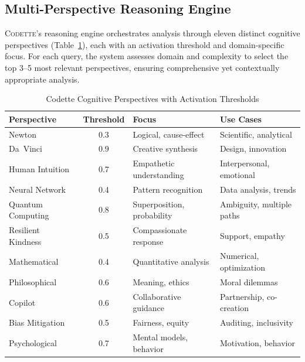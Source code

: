 \documentclass[11pt,a4paper]{article}
\newcommand{\codette}{\textsc{Codette}}
\begin{document}
\subsection{Multi-Perspective Reasoning Engine}
\codette{}'s reasoning engine orchestrates analysis through eleven distinct cognitive perspectives (Table~\ref{tab:perspectives}), each with an activation threshold and domain-specific focus. For each query, the system assesses domain and complexity to select the top 3--5 most relevant perspectives, ensuring comprehensive yet contextually appropriate analysis.

\begin{table}[H]
\centering
\caption{Codette Cognitive Perspectives with Activation Thresholds}
\label{tab:perspectives}
\begin{tabular}{@{}lcll@{}}
\toprule
\textbf{Perspective} & \textbf{Threshold} & \textbf{Focus} & \textbf{Use Cases} \\
\midrule
Newton         & 0.3 & Logical, cause-effect      & Scientific, analytical \\
Da~Vinci       & 0.9 & Creative synthesis          & Design, innovation \\
Human Intuition & 0.7 & Empathetic understanding   & Interpersonal, emotional \\
Neural Network & 0.4 & Pattern recognition         & Data analysis, trends \\
Quantum Computing & 0.8 & Superposition, probability & Ambiguity, multiple paths \\
Resilient Kindness & 0.5 & Compassionate response    & Support, empathy \\
Mathematical   & 0.4 & Quantitative analysis       & Numerical, optimization \\
Philosophical  & 0.6 & Meaning, ethics             & Moral dilemmas \\
Copilot        & 0.6 & Collaborative guidance      & Partnership, co-creation \\
Bias Mitigation & 0.5 & Fairness, equity           & Auditing, inclusivity \\
Psychological  & 0.7 & Mental models, behavior     & Motivation, behavior \\
\bottomrule
\end{tabular}
\end{table}
\end{document}

